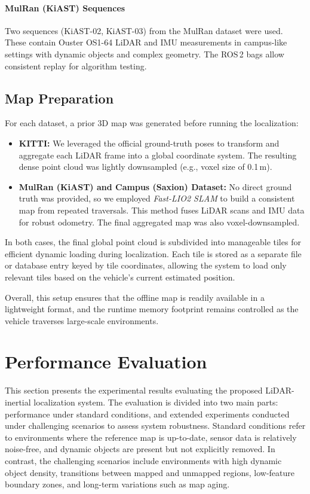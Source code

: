 \paragraph{MulRan (KiAST) Sequences}
Two sequences (KiAST-02, KiAST-03) from the MulRan dataset were used. These contain Ouster OS1-64 LiDAR and IMU measurements in campus-like settings with dynamic objects and complex geometry. The ROS\,2 bags allow consistent replay for algorithm testing.

\subsection{Map Preparation}
For each dataset, a prior 3D map was generated before running the localization:

\begin{itemize}
    \item \textbf{KITTI:} We leveraged the official ground-truth poses to transform and aggregate each LiDAR frame into a global coordinate system. The resulting dense point cloud was lightly downsampled (e.g., voxel size of 0.1\,m).
    \item \textbf{MulRan (KiAST) and Campus (Saxion) Dataset:} No direct ground truth was provided, so we employed \textit{Fast-LIO2 SLAM} to build a consistent map from repeated traversals. This method fuses LiDAR scans and IMU data for robust odometry. The final aggregated map was also voxel-downsampled.
\end{itemize}

In both cases, the final global point cloud is subdivided into manageable tiles for efficient dynamic loading during localization. Each tile is stored as a separate file or database entry keyed by tile coordinates, allowing the system to load only relevant tiles based on the vehicle’s current estimated position.

Overall, this setup ensures that the offline map is readily available in a lightweight format, and the runtime memory footprint remains controlled as the vehicle traverses large-scale environments.


\section{Performance Evaluation}
This section presents the experimental results evaluating the proposed LiDAR-inertial localization system. The evaluation is divided into two main parts: performance under standard conditions, and extended experiments conducted under challenging scenarios to assess system robustness. Standard conditions refer to environments where the reference map is up-to-date, sensor data is relatively noise-free, and dynamic objects are present but not explicitly removed. In contrast, the challenging scenarios include environments with high dynamic object density, transitions between mapped and unmapped regions, low-feature boundary zones, and long-term variations such as map aging.
